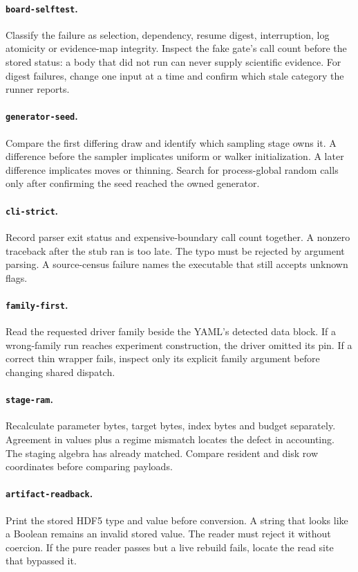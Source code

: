 \documentclass[10pt,aps,prd,twocolumn,nofootinbib]{revtex4-2}
\newcommand{\code}[1]{\texttt{#1}}
\begin{document}
\paragraph{\code{board-selftest}.}
Classify the failure as selection, dependency, resume digest, interruption,
log atomicity or evidence-map integrity.  Inspect the fake gate's call count
before the stored status: a body that did not run can never supply scientific
evidence.  For digest failures, change one input at a time and confirm which
stale category the runner reports.

\paragraph{\code{generator-seed}.}
Compare the first differing draw and identify which sampling stage owns it.
A difference before the sampler implicates uniform or walker initialization.
A later difference implicates moves or thinning.  Search for process-global
random calls only after confirming the seed reached the owned generator.

\paragraph{\code{cli-strict}.}
Record parser exit status and expensive-boundary call count together.  A
nonzero traceback after the stub ran is too late.  The typo must be rejected by
argument parsing.  A source-census failure names the executable that still
accepts unknown flags.

\paragraph{\code{family-first}.}
Read the requested driver family beside the YAML's detected data block.  If a
wrong-family run reaches experiment construction, the driver omitted its pin.
If a correct thin wrapper fails, inspect only its explicit family argument
before changing shared dispatch.

\paragraph{\code{stage-ram}.}
Recalculate parameter bytes, target bytes, index bytes and budget separately.
Agreement in values plus a regime mismatch locates the defect in accounting.
The staging algebra has already matched.  Compare resident and disk row
coordinates before comparing payloads.

\paragraph{\code{artifact-readback}.}
Print the stored HDF5 type and value before conversion.  A string that looks
like a Boolean remains an invalid stored value.  The reader must reject it
without coercion.  If the pure reader passes
but a live rebuild fails, locate the read site that bypassed it.
\end{document}
